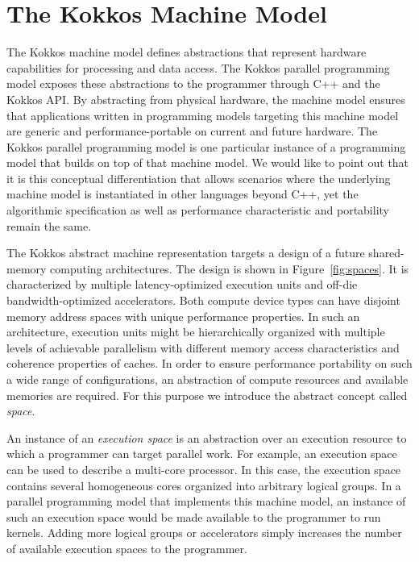 \section{The Kokkos Machine Model}\label{chap:kokkosMM}

The Kokkos machine model defines abstractions that represent hardware capabilities for processing and data access. The Kokkos parallel programming model exposes these abstractions to the programmer through C++ and the Kokkos API. By abstracting from physical hardware, the machine model ensures that applications written in programming models targeting this machine model are generic and performance-portable on current and future hardware. The Kokkos parallel programming model is one particular instance of a programming model that builds on top of that machine model. We would like to point out that it is this conceptual differentiation that allows scenarios where the underlying machine model is instantiated in other languages beyond C++, yet the algorithmic specification as well as performance characteristic and portability remain the same. 

The Kokkos abstract machine representation targets a design of a future shared-memory computing architectures. The design is shown in Figure~\ref{fig:spaces}. It is characterized by multiple latency-optimized execution units and off-die bandwidth-optimized accelerators. Both compute device types can have disjoint memory address spaces with unique performance properties. In such an architecture, execution units might be hierarchically organized with multiple levels of achievable parallelism with different memory access characteristics and coherence properties of caches. In order to ensure performance portability on such a wide range of configurations, an abstraction of compute resources and available memories are required. For this purpose we introduce the abstract concept called \emph{space}.

An instance of an \emph{execution space} is an abstraction over an execution resource to which a programmer can target parallel work. For example, an execution space can be used to describe a multi-core processor. In this case, the execution space contains several homogeneous cores organized into arbitrary logical groups. In a parallel programming model that implements this machine model, an instance of such an execution space would be made available to the programmer to run kernels. Adding more logical groups or accelerators simply increases the number of available execution spaces to the programmer.

